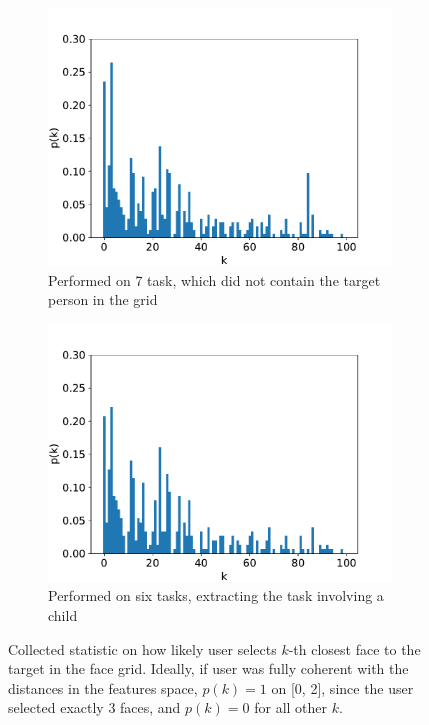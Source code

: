 \begin{figure}
    \centering
    \begin{subfigure}[b]{0.48\textwidth}
     \centering
     \includegraphics[width=\textwidth]{graphs/survey_distribution_without_the_easy.pdf}
     \caption{Performed on 7 task, which did not contain the target person in the grid}
     \label{fig:survey_all}
    \end{subfigure}
    \begin{subfigure}[b]{0.48\textwidth}
     \centering
     \includegraphics[width=\textwidth]{graphs/survey_distribution_childless.pdf}
     \caption{Performed on six tasks, extracting the task involving a child}
     \label{fig:suvery_childless}
    \end{subfigure}
    
    \caption{Collected statistic on how likely user selects $k$-th closest face to the target in the face grid. Ideally, if user was fully coherent with the distances in the features space, $p(k) = 1$ on [0, 2], since the user selected exactly 3 faces, and $p(k) = 0$ for all other $k$.}
    \label{fig:survey_distribution}
\end{figure}


